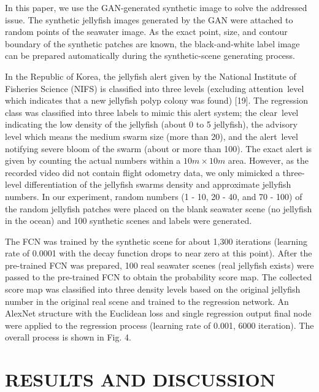 \documentclass{ieeeaccess}
\begin{document}
In this paper, we use the GAN-generated synthetic image to solve the addressed issue. The synthetic jellyfish images generated by the GAN were attached to random points of the seawater image. As the exact point, size, and contour boundary of the synthetic patches are known, the black-and-white label image can be prepared automatically during the synthetic-scene generating process.

In the Republic of Korea, the jellyfish alert given by the National Institute of Fisheries Science (NIFS) is classified into three levels (excluding \textquotesingle attention\textquotesingle\, level which indicates that a new jellyfish polyp colony was found) [19]. The regression class was classified into three labels to mimic this alert system; the \textquotesingle clear\textquotesingle\, level indicating the low density of the jellyfish (about 0 to 5 jellyfish), the \textquotesingle advisory\textquotesingle\, level which means the medium swarm size (more than 20), and the \textquotesingle alert\textquotesingle\, level notifying severe bloom of the swarm (about or more than 100). The exact alert is given by counting the actual numbers within a $10 m \times 10 m$ area. However, as the recorded video did not contain flight odometry data, we only mimicked a three-level differentiation of the jellyfish swarm\textquotesingle s density and approximate jellyfish numbers. In our experiment, random numbers (1 - 10, 20 - 40, and 70 - 100) of the random jellyfish patches were placed on the blank seawater scene (no jellyfish in the ocean) and 100 synthetic scenes and labels were generated.

The FCN was trained by the synthetic scene for about 1,300 iterations (learning rate of 0.0001 with the decay function drops to near zero at this point). After the pre-trained FCN was prepared, 100 real seawater scenes (real jellyfish exists) were passed to the pre-trained FCN to obtain the probability score map. The collected score map was classified into three density levels based on the original jellyfish number in the original real scene and trained to the regression network. An AlexNet structure with the Euclidean loss and single regression output final node were applied to the regression process (learning rate of 0.001, 6000 iteration). The overall process is shown in Fig. 4.

\section{RESULTS AND DISCUSSION}
\end{document}
